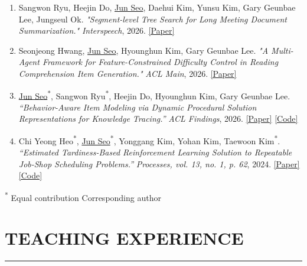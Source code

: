 \documentclass[11pt]{article}
\newcommand{\sectionline}{\vspace{-0.5ex}\noindent\rule{\textwidth}{0.4pt}\vspace{0.6ex}}
\begin{document}
\begin{enumerate}[leftmargin=1.2em, itemsep=4pt]

  \item Sangwon Ryu, Heejin Do, \underline{Jun Seo}, Daehui Kim, Yunsu Kim, Gary Geunbae Lee, Jungseul Ok.
  \textit{"Segment-level Tree Search for Long Meeting Document Summarization."}
  \textit{Interspeech}, 2026.
  \href{https://arxiv.org/pdf/2606.08445}{[Paper]}

  \item Seonjeong Hwang, \underline{Jun Seo}, Hyounghun Kim, Gary Geunbae Lee.
  \textit{"A Multi-Agent Framework for Feature-Constrained Difficulty Control in Reading Comprehension Item Generation."}
  \textit{ACL Main}, 2026.
  \href{https://arxiv.org/pdf/2605.19316}{[Paper]}

  \item \underline{Jun Seo}\textsuperscript{*}, Sangwon Ryu\textsuperscript{*}, Heejin Do\textsuperscript{\dag}, Hyounghun Kim, Gary Geunbae Lee\textsuperscript{\dag}.
  \textit{“Behavior-Aware Item Modeling via Dynamic Procedural Solution Representations for Knowledge Tracing.”}
  \textit{ACL Findings}, 2026.
  \href{https://arxiv.org/abs/2604.08260}{[Paper]}
  \href{https://github.com/sjin4861/BAIM.git}{[Code]}

  \item Chi Yeong Heo\textsuperscript{*}, \underline{Jun Seo}\textsuperscript{*}, Yonggang Kim, Yohan Kim, Taewoon Kim\textsuperscript{*}.
  \textit{“Estimated Tardiness-Based Reinforcement Learning Solution to Repeatable Job-Shop Scheduling Problems.”}
  \textit{Processes, vol. 13, no. 1, p. 62}, 2024.
  \href{https://www.mdpi.com/3114726}{[Paper]}
  \href{https://github.com/Huch0/RL-Scheduler.git}{[Code]}

\end{enumerate}

\vspace{2pt}
\textsuperscript{*} Equal contribution \quad \textsuperscript{\dag} Corresponding author


\vspace{10pt}
\section*{TEACHING EXPERIENCE}
\sectionline
\end{document}
